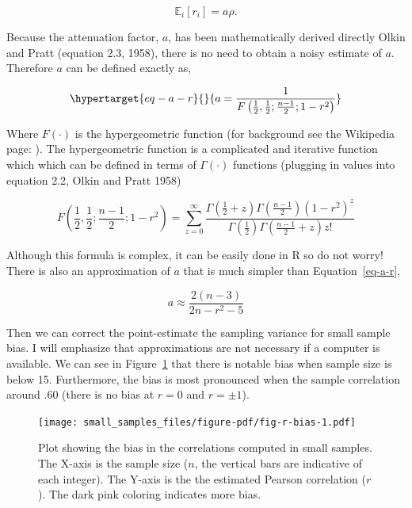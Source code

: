 \documentclass[
  letterpaper,
  DIV=11,
  numbers=noendperiod]{scrreprt}
\begin{document}
\[
\mathbb{E}_i[r_i] = a\rho.
\]

Because the attenuation factor, \(a\), has been mathematically derived
directly Olkin and Pratt (equation 2.3, 1958), there is no need to
obtain a noisy estimate of \(a\). Therefore \(a\) can be defined exactly
as,

\begin{equation}\protect\hypertarget{eq-a-r}{}{
a = \frac{1}{F\left(\frac{1}{2},\frac{1}{2};\frac{n-1}{2};1-r^2\right)}
}\label{eq-a-r}\end{equation}

Where \(F(\cdot)\) is the hypergeometric function (for background see
the Wikipedia page: ). The hypergeometric function is a complicated and
iterative function which which can be defined in terms of
\(\Gamma(\cdot)\) functions (plugging in values into equation 2.2, Olkin
and Pratt 1958)

\[
F\left(\frac{1}{2},\frac{1}{2};\frac{n-1}{2};1-r^2\right) = \sum^{\infty}_{z=0} \frac{\Gamma\left(\frac{1}{2} + z\right)\Gamma\left(\frac{n-1}{2}\right)\left(1-r^2\right)^z}{\Gamma\left(\frac{1}{2}\right)\Gamma\left(\frac{n-1}{2}+z\right)z!}
\]

Although this formula is complex, it can be easily done in R so do not
worry! There is also an approximation of \(a\) that is much simpler than
Equation~\ref{eq-a-r},

\[
a \approx \frac{2(n-3)}{2n-r^2-5}
\]

Then we can correct the point-estimate the sampling variance for small
sample bias. I will emphasize that approximations are not necessary if a
computer is available. We can see in Figure~\ref{fig-r-bias} that there
is notable bias when sample size is below 15. Furthermore, the bias is
most pronounced when the sample correlation around .60 (there is no bias
at \(r=0\) and \(r=\pm 1\)).

\begin{figure}[H]

{\centering \texttt{[image: small\_samples\_files/figure-pdf/fig-r-bias-1.pdf]}

}

\caption{\label{fig-r-bias}Plot showing the bias in the correlations
computed in small samples. The X-axis is the sample size (\(n\), the
vertical bars are indicative of each integer). The Y-axis is the the
estimated Pearson correlation (\(r\)). The dark pink coloring indicates
more bias.}

\end{figure}
\end{document}
